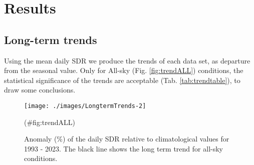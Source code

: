 \documentclass[preprint, 3p,
authoryear]{elsarticle} %
\begin{document}
\hypertarget{results}{%
\section{Results}\label{results}}

\hypertarget{long-term-trends}{%
\subsection{Long-term trends}\label{long-term-trends}}

Using the mean daily SDR we produce the trends of each data set, as
departure from the seasonal value. Only for All-sky (Fig.
\ref{fig:trendALL}) conditions, the statistical significance of the
trends are acceptable (Tab. \ref{tab:trendtable}), to draw some
conclusions.

\begin{figure}[h!]

{\centering \texttt{[image: ./images/LongtermTrends-2]} 

}

\caption{Anomaly (\%) of the daily SDR relative to climatological values for 1993 - 2023. The black line shows the long term trend for all-sky conditions.}(\#fig:trendALL)
\end{figure}
\end{document}
